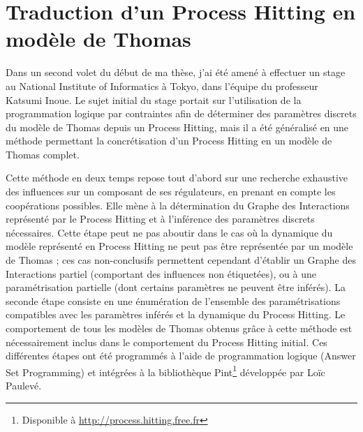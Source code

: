 
\section{Traduction d'un Process Hitting en modèle de Thomas}
Dans un second volet du début de ma thèse, j'ai été amené à effectuer un stage au National Institute of Informatics à Tokyo, dans l'équipe du professeur Katsumi Inoue.
Le sujet initial du stage portait sur l'utilisation de la programmation logique par contraintes afin de déterminer des paramètres discrets du modèle de Thomas depuis un Process Hitting, mais il a été généralisé en une méthode permettant la concrétisation d'un Process Hitting en un modèle de Thomas complet.

Cette méthode en deux temps repose tout d'abord sur une recherche exhaustive des influences sur un composant de ses régulateurs, en prenant en compte les coopérations possibles.
Elle mène à la détermination du Graphe des Interactions représenté par le Process Hitting et à l'inférence des paramètres discrets nécessaires.
Cette étape peut ne pas aboutir dans le cas où la dynamique du modèle représenté en Process Hitting ne peut pas être représentée par un modèle de Thomas ;
ces cas non-conclusifs permettent cependant d'établir un Graphe des Interactions partiel (comportant des influences non étiquetées), ou à une paramétrisation partielle (dont certains paramètres ne peuvent être inférés).
La seconde étape consiste en une énumération de l'ensemble des paramétrisations compatibles avec les paramètres inférés et la dynamique du Process Hitting.
Le comportement de tous les modèles de Thomas obtenus grâce à cette méthode est nécessairement inclus dans le comportement du Process Hitting initial.
Ces différentes étapes ont été programmés à l'aide de programmation logique (Answer Set Programming) et intégrées à la bibliothèque Pint\footnote{Disponible à \url{http://process.hitting.free.fr}} développée par Loïc Paulevé.




